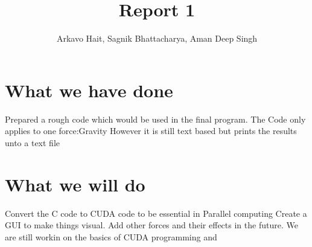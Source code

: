 \documentclass{article}
\title{Report 1}
\author{Arkavo Hait, Sagnik Bhattacharya, Aman Deep Singh}
\begin{document}
\maketitle
\section{What we have done}

Prepared a rough code which would be used in the final program.
The Code only applies to one force:Gravity
However it is still text based but prints the results unto a text file

\section{What we will do}

Convert the C code to CUDA code to be essential in Parallel computing
Create a GUI to make things visual.
Add other forces and their effects in the future.
We are still workin on the basics of CUDA programming and
\end{document}
